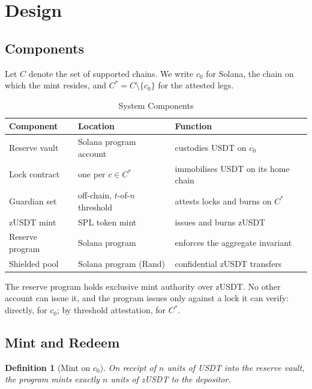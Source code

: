 \documentclass[11pt,a4paper]{article}
\newtheorem{definition}[theorem]{Definition}
\begin{document}
\section{Design}
\label{sec:design}

\subsection{Components}

Let $C$ denote the set of supported chains. We write $c_0$ for Solana, the chain on which the mint resides, and $C^{*} = C \setminus \{c_0\}$ for the attested legs.

\begin{table}[H]
\centering
\caption{System Components}
\begin{tabular}{@{}lll@{}}
\toprule
\textbf{Component} & \textbf{Location} & \textbf{Function} \\ \midrule
Reserve vault & Solana program account & custodies USDT on $c_0$ \\
Lock contract & one per $c \in C^{*}$ & immobilises USDT on its home chain \\
Guardian set & off-chain, $t$-of-$n$ threshold & attests locks and burns on $C^{*}$ \\
zUSDT mint & SPL token mint & issues and burns zUSDT \\
Reserve program & Solana program & enforces the aggregate invariant \\
Shielded pool & Solana program (Rand) & confidential zUSDT transfers \\ \bottomrule
\end{tabular}
\end{table}

The reserve program holds exclusive mint authority over zUSDT. No other account can issue it, and the program issues only against a lock it can verify: directly, for $c_0$; by threshold attestation, for $C^{*}$.

\subsection{Mint and Redeem}

\begin{definition}[Mint on $c_0$]
On receipt of $n$ units of USDT into the reserve vault, the program mints exactly $n$ units of zUSDT to the depositor.
\end{definition}
\end{document}
